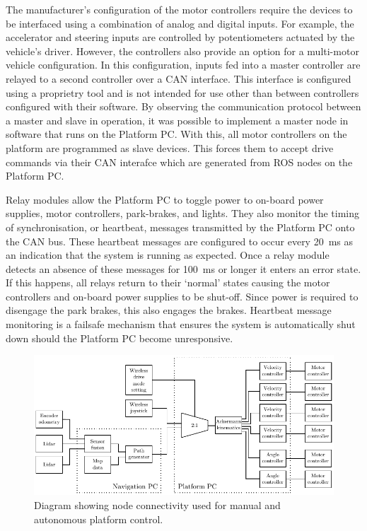 \documentclass[preprint,authoryear,12pt]{elsarticle}
\begin{document}
        The manufacturer's configuration of the motor controllers require the devices to be interfaced using a combination of analog and digital inputs.
        For example, the accelerator and steering inputs are controlled by potentiometers actuated by the vehicle's driver.
        However, the controllers also provide an option for a multi-motor vehicle configuration.
        In this configuration, inputs fed into a master controller are relayed to a second controller over a CAN interface.
        This interface is configured using a proprietry tool and is not intended for use other than between controllers configured with their software.
        By observing the communication protocol between a master and slave in operation, it was possible to implement a master node in software that runs on the Platform PC.
        With this, all motor controllers on the platform are programmed as slave devices.
        This forces them to accept drive commands via their CAN interafce which are generated from ROS nodes on the Platform PC.

        Relay modules allow the Platform PC to toggle power to on-board power supplies, motor controllers, park-brakes, and lights.
        They also monitor the timing of synchronisation, or heartbeat, messages transmitted by the Platform PC onto the CAN bus.
        These heartbeat messages are configured to occur every \SI{20}{\milli\second} as an indication that the system is running as expected.
        Once a relay module detects an absence of these messages for \SI{100}{\milli\second} or longer it enters an error state.
        If this happens, all relays return to their `normal' states causing the motor controllers and on-board power supplies to be shut-off.
        Since power is required to disengage the park brakes, this also engages the brakes.
        Heartbeat message monitoring is a failsafe mechanism that ensures the system is automatically shut down should the Platform PC become unresponsive.

        \begin{figure}[htb]
            \centering
            \includegraphics[width=\linewidth]{imgs/system_diagram/software_v2.pdf}
            \caption{Diagram showing node connectivity used for manual and autonomous platform control.}
            \label{fig:system_diagram_software}
        \end{figure}
\end{document}
